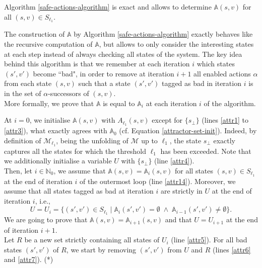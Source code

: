 

\begin{lemma}\label{attr-algo-lemma-1}
Algorithm \ref{safe-actions-algorithm} is exact and allows to determine $\mathbb{A}(s, v)$ for all $(s, v)\in S_{\ell_1}$.
\end{lemma}

\begin{proof2}
The construction of $\mathbb{A}$ by Algorithm \ref{safe-actions-algorithm} exactly behaves like the recursive computation of $\mathbb{A}$, but allows to only consider the interesting states at each step instead of always checking all states of the system.
The key idea behind this algorithm is that we remember at each iteration $i$ which states $(s',v')$ become ``bad", in order to remove at iteration $i+1$ all enabled actions $\alpha$ from each state $(s, v)$ such that a state $(s', v')$ tagged as bad in iteration $i$ is in the set of $\alpha$-successors of $(s, v)$. \\
More formally, we prove that $\mathbb{A}$ is equal to $\mathbb{A}_i$ at each iteration $i$ of the algorithm.
\par At $i=0$,
we initialise $\mathbb{A}(s, v)$ with $A_{\ell_1}(s, v)$ except for $\{s_\bot\}$ (lines \ref{attr1} to \ref{attr3}), what exactly agrees with $\mathbb{A}_0$ (cf. Equation \ref{attractor-set-init}).
Indeed, by definition of $\mathcal{M}_{\ell_1}$, being the unfolding of $\mathcal{M}$ up to $\ell_1$, the state $s_\bot$ exactly captures all the states for which the threshold $\ell_1$ has been exceeded.
Note that we additionally initialise a variable $U$ with $\{s_\bot\}$ (line \ref{attr4}).\\
Then, let $i \in \mathbb{N}_0$, we assume that $\mathbb{A}(s, v) = \mathbb{A}_i(s, v)$ for all states $(s, v) \in S_{\ell_1}$ at the end of iteration $i$ of the outermost loop (line \ref{attr14}).
Moreover, we assume that all states tagged as bad at iteration $i$ are strictly in $U$ at the end of iteration $i$, i.e., \[U = U_i = \{(s', v') \in S_{\ell_1} \; | \; \mathbb{A}_i(s', v') = \emptyset \; \wedge \; \mathbb{A}_{i-1}(s', v') \neq \emptyset \}.\]
We are going to prove that $\mathbb{A}(s, v) = \mathbb{A}_{i+1}(s, v)$ and that $U = U_{i+1}$ at the end of iteration $i+1$.\\
Let $R$ be a new set strictly containing all states of $U_i$ (line \ref{attr5}).
For all bad states $(s', v')$ of $R$, we start by removing $(s', v')$ from $U$ and $R$ (lines \ref{attr6} and \ref{attr7}).  {\color{umons-red}(*)}\\

\end{proof2}
